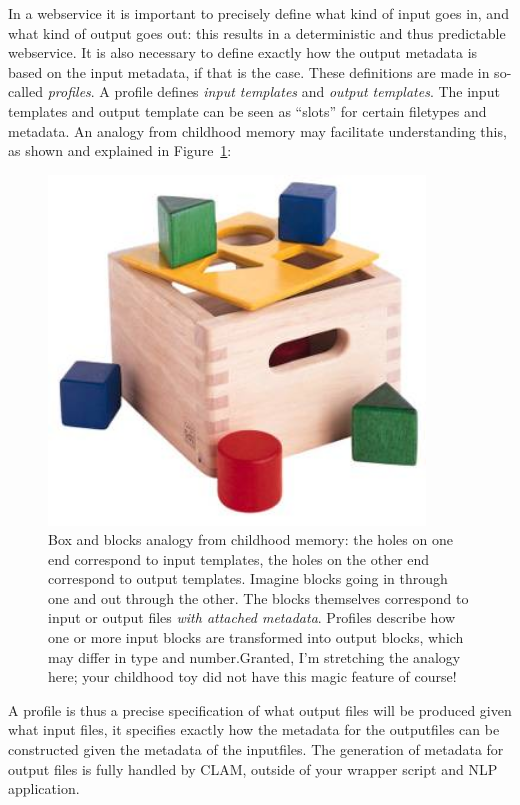 \documentclass[a4paper,12pt]{report}
\begin{document}
In a webservice it is important to precisely define what kind of input goes in,
and what kind of output goes out: this results in a deterministic and thus
predictable webservice. It is also necessary to define exactly how the output
metadata is based on the input metadata, if that is the case. These definitions
are made in so-called \emph{profiles}. A profile defines \emph{input templates}
and \emph{output templates}. The input templates and output template can be
seen as ``slots'' for certain filetypes and metadata. An analogy from childhood
memory may facilitate understanding this, as shown and explained in
Figure~\ref{fig:blokkendoos}:

\begin{figure}[h]
\begin{center}
\includegraphics[width=100.0mm]{blokkendoos.jpg}
\caption{Box and blocks analogy from childhood memory: the holes on one end
correspond to input templates, the holes on the other end correspond to output
templates. Imagine blocks going in through one and out through the other. The
blocks themselves correspond to input or output files \emph{with attached
metadata}. Profiles describe how one or more input blocks are transformed into
output blocks, which may differ in type and number.Granted, I'm stretching the
analogy here; your childhood toy did not have this magic feature of course!}
\label{fig:blokkendoos} 
\end{center}
\end{figure}

A profile is thus a precise specification of what output files will be produced
given what input files,  it specifies exactly how the metadata for the
outputfiles can be constructed given the metadata of the inputfiles. The
generation of metadata for output files is fully handled by CLAM, outside of
your wrapper script and NLP application.
\end{document}
